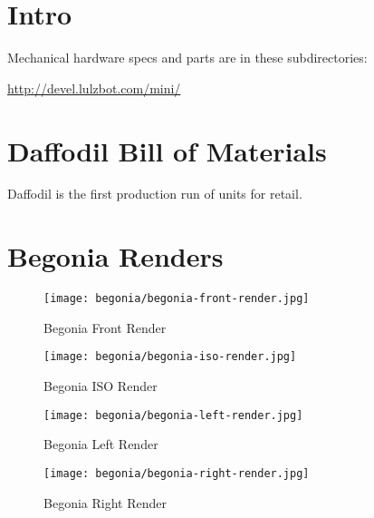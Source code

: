 %
%
%
%
%

\section{Intro}
Mechanical hardware specs and parts are in these subdirectories:

\url{http://devel.lulzbot.com/mini/}

\section{Daffodil Bill of Materials}
Daffodil is the first production run of units for retail.



\section{Begonia Renders}

\begin{figure}[H]
\centering
\texttt{[image: begonia/begonia-front-render.jpg]}
\caption{Begonia Front Render}
\label{fig:begfrontrender}
\end{figure}

\begin{figure}[H]
\centering
\texttt{[image: begonia/begonia-iso-render.jpg]}
\caption{Begonia ISO Render}
\label{fig:begisorender}
\end{figure}

\begin{figure}[H]
\centering
\texttt{[image: begonia/begonia-left-render.jpg]}
\caption{Begonia Left Render}
\label{fig:begleftrender}
\end{figure}

\begin{figure}[H]
\centering
\texttt{[image: begonia/begonia-right-render.jpg]}
\caption{Begonia Right Render}
\label{fig:begrightrender}
\end{figure}

